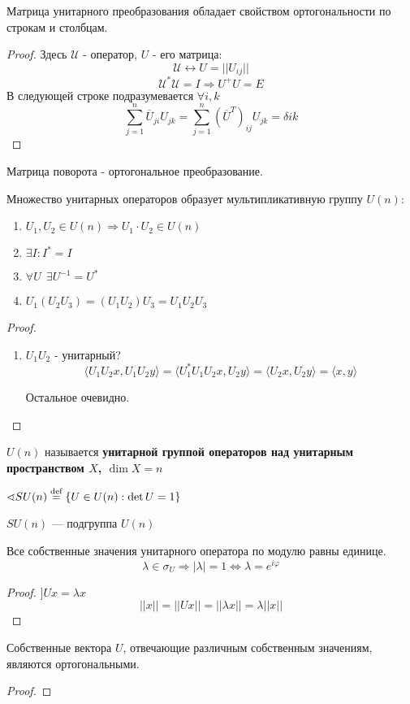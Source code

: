 \begin{lemma}
    Матрица унитарного преобразования обладает свойством ортогональности по строкам и столбцам.
\end{lemma}
\begin{proof}
    Здесь $\mathcal U$ - оператор, $U$ - его матрица:
    $$\mathcal U \leftrightarrow U=||U_{ij}||$$
    $$\mathcal U^* \mathcal U=I \Rightarrow U^+U = E$$
    В следующей строке подразумевается $\forall i,k$
    $$\sum_{j=1}^n \overline U_{ji}U_{jk}=\sum_{j=1}^n (\overline U^T)_{ij} U_{jk} = \delta{ik}$$
\end{proof}
\begin{example}
    Матрица поворота - ортогональное преобразование.
\end{example}
\begin{lemma}
    Множество унитарных операторов образует мультипликативную группу $U(n)$:
    \begin{enumerate}
        \item $U_1, U_2\in U(n) \Rightarrow U_1\cdot U_2\in U(n)$
        \item $\exists I : I^*=I$
        \item $\forall U \ \ \exists U^{-1} = U^*$
        \item $U_1(U_2U_3)=(U_1U_2)U_3=U_1U_2U_3$
    \end{enumerate}
\end{lemma}
\begin{proof}
    \begin{enumerate}
        \item $U_1U_2$ - унитарный?
              $$\langle U_1U_2x, U_1U_2y \rangle = \langle U_1^*U_1U_2x, U_2y \rangle = \langle U_2 x, U_2 y\rangle = \langle x, y\rangle$$

              Остальное очевидно.
    \end{enumerate}
\end{proof}

$U(n)$ называется \textbf{унитарной группой операторов над унитарным пространством $X$, $\dim X = n$}

$\sphericalangle SU(n) \stackrel{\text{def}}{=} \{U\in U(n) : \det U = 1\}$

\begin{lemma}
    $SU(n)$ --- подгруппа $U(n)$
\end{lemma}
\begin{lemma}
    Все собственные значения унитарного оператора по модулю равны единице.
    $$\lambda\in \sigma_U \Rightarrow |\lambda|=1 \Leftrightarrow \lambda = e^{i\varphi}$$
\end{lemma}
\begin{proof}
    $] Ux = \lambda x$
    $$||x||=||Ux||=||\lambda x||=\lambda ||x||$$
\end{proof}
\begin{lemma}
    Собственные вектора $U$, отвечающие различным собственным значениям, являются ортогональными.
\end{lemma}
\begin{proof}
\end{proof}

